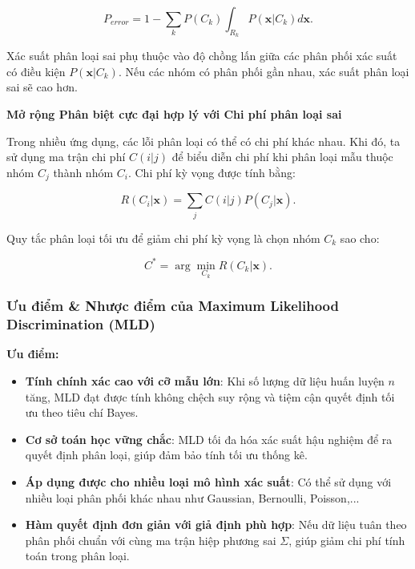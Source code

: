 \begin{equation}
P_{error} = 1 - \sum_{k} P(C_k) \int_{R_k} P(\mathbf{x} | C_k) d\mathbf{x}.
\tag{2.2.13}
\end{equation}

Xác suất phân loại sai phụ thuộc vào độ chồng lấn giữa các phân phối xác suất có điều kiện \( P(\mathbf{x} | C_k) \). Nếu các nhóm có phân phối gần nhau, xác suất phân loại sai sẽ cao hơn.

\textbf{Mở rộng Phân biệt cực đại hợp lý với Chi phí phân loại sai}

Trong nhiều ứng dụng, các lỗi phân loại có thể có chi phí khác nhau. Khi đó, ta sử dụng ma trận chi phí \( C(i|j) \) để biểu diễn chi phí khi phân loại mẫu thuộc nhóm \( C_j \) thành nhóm \( C_i \). Chi phí kỳ vọng được tính bằng:

\begin{equation}
R(C_i | \mathbf{x}) = \sum_{j} C(i|j) P(C_j | \mathbf{x}).
\tag{2.2.14}
\end{equation}

Quy tắc phân loại tối ưu để giảm chi phí kỳ vọng là chọn nhóm \( C_k \) sao cho:

\begin{equation}
C^* = \arg\min_{C_k} R(C_k | \mathbf{x}).
\tag{2.2.15}
\end{equation}

\subsubsection{Ưu điểm \& Nhược điểm của Maximum Likelihood Discrimination (MLD)}

\textbf{Ưu điểm:}
\begin{itemize}
    \item \textbf{Tính chính xác cao với cỡ mẫu lớn}: Khi số lượng dữ liệu huấn luyện $n$ tăng, MLD đạt được tính không chệch suy rộng và tiệm cận quyết định tối ưu theo tiêu chí Bayes.
    
    \item \textbf{Cơ sở toán học vững chắc}: MLD tối đa hóa xác suất hậu nghiệm để ra quyết định phân loại, giúp đảm bảo tính tối ưu thống kê.

    \item \textbf{Áp dụng được cho nhiều loại mô hình xác suất}: Có thể sử dụng với nhiều loại phân phối khác nhau như Gaussian, Bernoulli, Poisson,...

    \item \textbf{Hàm quyết định đơn giản với giả định phù hợp}: Nếu dữ liệu tuân theo phân phối chuẩn với cùng ma trận hiệp phương sai $\Sigma$, giúp giảm chi phí tính toán trong phân loại.
\end{itemize}

